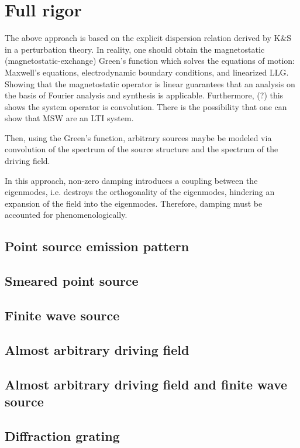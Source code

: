 \documentclass{article}
\begin{document}
\section{Full rigor}
The above approach is based on the explicit dispersion relation derived by K\&{}S in a perturbation theory. In reality, one should obtain the magnetostatic (magnetostatic-exchange) Green's function which solves the equations of motion: Maxwell's equations, electrodynamic boundary conditions, and linearized LLG. Showing that the magnetostatic operator is linear guarantees that an analysis on the basis of Fourier analysis and synthesis is applicable. Furthermore, (?) this shows the system operator is convolution. There is the possibility that one can show that MSW are an LTI system.

Then, using the Green's function, arbitrary sources maybe be modeled via convolution of the spectrum of the source structure and the spectrum of the driving field. 

In this approach, non-zero damping introduces a coupling between the eigenmodes, i.e. destroys the orthogonality of the eigenmodes, hindering an expansion of the field into the eigenmodes. Therefore, damping must be accounted for phenomenologically.

\subsection{Point source emission pattern}

\subsection{Smeared point source}

\subsection{Finite wave source}

\subsection{Almost arbitrary driving field}

\subsection{Almost arbitrary driving field and finite wave source}

\subsection{Diffraction grating}
\end{document}
